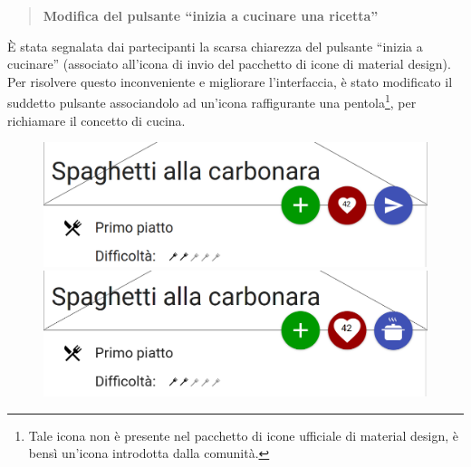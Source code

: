 \begin{quote}
	\textbf{Modifica del pulsante ``inizia a cucinare una ricetta''}
\end{quote}
È stata segnalata dai partecipanti la scarsa chiarezza del pulsante ``inizia a
cucinare'' (associato all'icona di invio del pacchetto di icone di material
design).  Per risolvere questo inconveniente e migliorare l'interfaccia, è stato
modificato il suddetto pulsante associandolo ad un'icona raffigurante una
pentola\footnote{Tale icona non è presente nel pacchetto di icone ufficiale di
material design, è bensì un'icona introdotta dalla comunità.}, per richiamare il concetto di cucina.
\begin{figure}[H]
	\begin{minipage}{.49\textwidth}
		\includegraphics[width=\textwidth]{img/modifiche/presentazione_ricetta_old2.png}
	\end{minipage}
	\begin{minipage}{.49\textwidth}
		\includegraphics[width=\textwidth]{img/modifiche/presentazione_ricetta_new.png}
	\end{minipage}
\end{figure}

